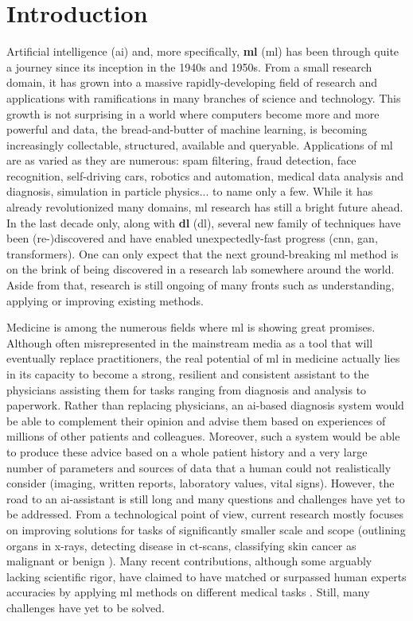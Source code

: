 \chapter{Introduction}

Artificial intelligence (\acrshort{ai}) and, more specifically, \textbf{\acrlong{ml}} (\acrshort{ml}) has been through quite a journey since its inception in the 1940s and 1950s. From a small research domain, it has grown into a massive rapidly-developing field of research and applications with ramifications in many branches of science and technology. This growth is not surprising in a world where computers become more and more powerful and data, the bread-and-butter of machine learning, is becoming increasingly collectable, structured, available and queryable. Applications of \acrshort{ml} are as varied as they are numerous: spam filtering, fraud detection, face recognition, self-driving cars, robotics and automation, medical data analysis and diagnosis, simulation in particle physics... to name only a few. While it has already revolutionized many domains, \acrshort{ml} research has still a bright future ahead. In the last decade only, along with \textbf{\acrlong{dl}} (\acrshort{dl}), several new family of techniques have been (re-)discovered and have enabled unexpectedly-fast progress (\eg \acrlong{cnn}, \acrlong{gan}, transformers). One can only expect that the next ground-breaking \acrshort{ml} method is on the brink of being discovered in a research lab somewhere around the world. Aside from that, research is still ongoing of many fronts such as understanding, applying or improving existing methods.

Medicine is among the numerous fields where \acrshort{ml} is showing great promises. Although often misrepresented in the mainstream media as a tool that will eventually replace practitioners, the real potential of \acrshort{ml} in medicine actually lies in its capacity to become a strong, resilient and consistent assistant to the physicians \parencite{rajkomar2019machine} assisting them for tasks ranging from diagnosis and analysis to paperwork. Rather than replacing physicians, an \acrshort{ai}-based diagnosis system would be able to complement their opinion and advise them based on experiences of millions of other patients and colleagues. Moreover, such a system would be able to produce these advice based on a whole patient history and a very large number of parameters and sources of data that a human could not realistically consider (imaging, written reports, laboratory values, vital signs). However, the road to an \acrshort{ai}-assistant is still long and many questions and challenges have yet to be addressed. From a technological point of view, current research mostly focuses on improving solutions for tasks of significantly smaller scale and scope (\eg outlining organs in x-rays, detecting disease in \acrshort{ct}-scans, classifying skin cancer as malignant or benign ). Many recent contributions, although some arguably lacking scientific rigor, have claimed to have matched or surpassed human experts accuracies by applying \acrshort{ml} methods on different medical tasks \parencite{nagendran2020artificial}. Still, many challenges have yet to be solved. 

